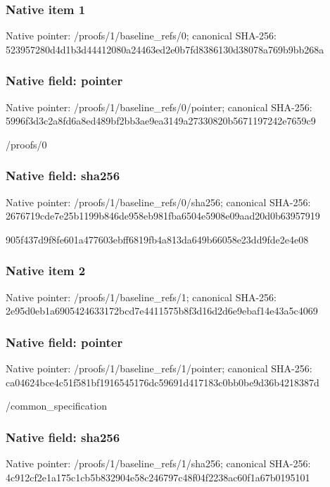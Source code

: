 \documentclass[10pt,a4paper]{article}
\begin{document}
\subsubsection{Native item 1}
Native pointer: /proofs/1/baseline\_\allowbreak{}refs/0; canonical SHA-256: 523957280d4d1b3d44412080a24463ed2e0b7fd8386130d38078a769b9bb268a

\subsubsection{Native field: pointer}
Native pointer: /proofs/1/baseline\_\allowbreak{}refs/0/pointer; canonical SHA-256: 5996f3d3c2a8fd6a8ed489bf2bb3ae9ea3149a27330820b5671197242e7659c9

\begingroup\raggedright\sloppy /\allowbreak{}proofs/\allowbreak{}0\par\endgroup

\subsubsection{Native field: sha256}
Native pointer: /proofs/1/baseline\_\allowbreak{}refs/0/sha256; canonical SHA-256: 2676719cde7e25b1199b846de958eb981fba6504e5908e09aad20d0b63957919

\begingroup\raggedright\sloppy 905f437d9f8fe601a477603ebff6819fb4a813da649b66058e23dd9fde2e4e08\par\endgroup

\subsubsection{Native item 2}
Native pointer: /proofs/1/baseline\_\allowbreak{}refs/1; canonical SHA-256: 2e95d0eb1a6905424633172bcd7e4411575b8f3d16d2d6e9ebaf14e43a5c4069

\subsubsection{Native field: pointer}
Native pointer: /proofs/1/baseline\_\allowbreak{}refs/1/pointer; canonical SHA-256: ca04624bce4c51f581bf1916545176dc59691d417183c0bb0be9d36b4218387d

\begingroup\raggedright\sloppy /\allowbreak{}common\_\allowbreak{}specification\par\endgroup

\subsubsection{Native field: sha256}
Native pointer: /proofs/1/baseline\_\allowbreak{}refs/1/sha256; canonical SHA-256: 4c912cf2e1a175c1cb5b832904e58c246797c48f04f2238ac60f1a67b0195101
\end{document}
